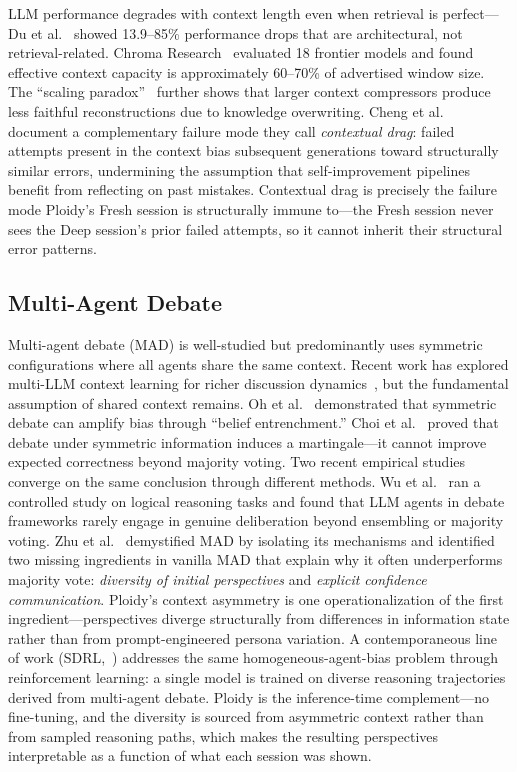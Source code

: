 \documentclass[11pt]{article}
\begin{document}
LLM performance degrades with context length even when retrieval is perfect---Du et al.~\citep{du2025context} showed 13.9--85\% performance drops that are architectural, not retrieval-related. Chroma Research~\citep{chroma2025contextrot} evaluated 18 frontier models and found effective context capacity is approximately 60--70\% of advertised window size. The ``scaling paradox''~\citep{scaling2026paradox} further shows that larger context compressors produce less faithful reconstructions due to knowledge overwriting. Cheng et al.~\citep{cheng2026contextualdrag} document a complementary failure mode they call \emph{contextual drag}: failed attempts present in the context bias subsequent generations toward structurally similar errors, undermining the assumption that self-improvement pipelines benefit from reflecting on past mistakes. Contextual drag is precisely the failure mode Ploidy's Fresh session is structurally immune to---the Fresh session never sees the Deep session's prior failed attempts, so it cannot inherit their structural error patterns.

\subsection{Multi-Agent Debate}
\label{sec:mad}

Multi-agent debate (MAD) is well-studied but predominantly uses symmetric configurations where all agents share the same context. Recent work has explored multi-LLM context learning for richer discussion dynamics~\citep{m2cl2026}, but the fundamental assumption of shared context remains. Oh et al.~\citep{oh2025dreamad} demonstrated that symmetric debate can amplify bias through ``belief entrenchment.'' Choi et al.~\citep{choi2025debate} proved that debate under symmetric information induces a martingale---it cannot improve expected correctness beyond majority voting. Two recent empirical studies converge on the same conclusion through different methods. Wu et al.~\citep{wu2025reallydebate} ran a controlled study on logical reasoning tasks and found that LLM agents in debate frameworks rarely engage in genuine deliberation beyond ensembling or majority voting. Zhu et al.~\citep{zhu2026demystifying} demystified MAD by isolating its mechanisms and identified two missing ingredients in vanilla MAD that explain why it often underperforms majority vote: \emph{diversity of initial perspectives} and \emph{explicit confidence communication}. Ploidy's context asymmetry is one operationalization of the first ingredient---perspectives diverge structurally from differences in information state rather than from prompt-engineered persona variation. A contemporaneous line of work (SDRL,~\citep{sdrl2026}) addresses the same homogeneous-agent-bias problem through reinforcement learning: a single model is trained on diverse reasoning trajectories derived from multi-agent debate. Ploidy is the inference-time complement---no fine-tuning, and the diversity is sourced from asymmetric context rather than from sampled reasoning paths, which makes the resulting perspectives interpretable as a function of what each session was shown.
\end{document}
